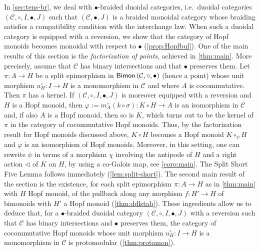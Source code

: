 \documentclass[nosumlimits,twoside]{amsart}
\theoremstyle{definition}
\theoremstyle{remark}
\newcommand{\Cc}{\mathcal{C}}
\def\Bimon{{\sf Bimon}}
\begin{document}
In \cref{sec:tens-br}, we deal with $\bullet$-braided duoidal categories, i.e.\ duoidal categories $(\Cc,\circ,I,\bullet,J)$ such that $(\Cc,\bullet,J)$ is a braided monoidal category whose braiding satisfies a compatibility condition with the interchange law. When such a duoidal category is equipped with a reversion, we show that the category of Hopf monoids becomes monoidal with respect to $\bullet$ (\cref{prop:Hopfbul}). One of the main results of this section is the \textit{factorization of points}, achieved in \cref{thm:main}. More precisely, assume that $\Cc$ has binary intersections and that $\bullet$ preserves them. Let $\pi:A\to H$ be a split epimorphism in $\Bimon \left(\Cc,\circ,\bullet\right) $ (hence a point) whose unit morphism
$u_{H}^{\circ }:I\to H$ is a monomorphism in $\Cc$ and where $A$ is cocommutative. Then $\pi$ has a kernel. If $\left( \mathcal{C}%
,\circ ,I,\bullet ,J\right) $ is moreover equipped with a reversion and $H$ is a Hopf monoid, then $\varphi:=m_{A}^{\circ }\left( k\circ \sigma \right)
:K\circ H\rightarrow A$ is an isomorphism in $\Cc$ and, if also $A$ is a Hopf monoid, then so is $K$, which turns out to be the kernel of $\pi$ in the category of cocommutative Hopf monoids. 
Thus, by the factorization result for Hopf monoids discussed above, $K\circ H$ becomes a Hopf monoid $K\circ_\psi H$ and $\varphi$ is an isomorphism of Hopf monoids. Moreover, in this setting, one can rewrite $\psi$ in terms of a morphism $\chi$ involving the antipode of $H$ and a right action $\triangleleft$ of $K$ on $H$, by using a co-Galois map, see \cref{coro:main}. The Split Short Five Lemma follows immediately (\cref{lem:split-short}). The second main result of the section is the existence, for each split epimorphism $\pi:A\to H$ as in \cref{thm:main} with $H$ Hopf monoid, of the pullback along any morphism $f:H'\to H$ of bimonoids with $H'$ a Hopf monoid (\cref{thm:ddlstab}).
These ingredients allow us to deduce that, for a $\bullet$-braided duoidal category $(\Cc,\circ,I,\bullet,J)$ with a reversion such that $\Cc$ has binary intersections and $\bullet$ preserves them, the category of cocommutative Hopf monoids whose unit morphism $u^{\circ}_{H}:I\to H$ is a monomorphism in $\Cc$ is protomodular (\cref{thm:protomon}).
\end{document}
